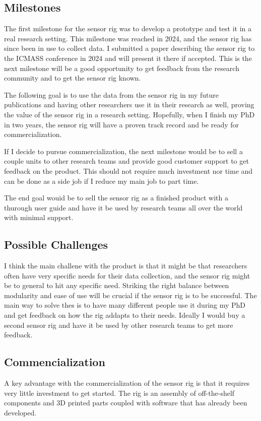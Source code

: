 \documentclass{iopconfser}
\begin{document}
\subsection*{Milestones}
The first milestone for the sensor rig was to develop a prototype and test it in a real research setting.
This milestone was reached in 2024, and the sensor rig has since been in use to collect data.
I submitted a paper describing the sensor rig to the ICMASS conference in 2024 and will present it there if accepted.
This is the next milestone will be a good opportunity to get feedback from the research community and to get the sensor rig known.

The following goal is to use the data from the sensor rig in my future publications and having other researchers use it in their research as well, proving the value of the sensor rig in a research setting.
Hopefully, when I finish my PhD in two years, the sensor rig will have a proven track record and be ready for commercialization.

If I decide to pursue commercialization, the next milestone would be to sell a couple units to other research teams and provide good customer support to get feedback on the product.
This should not require much investment nor time and can be done as a side job if I reduce my main job to part time.

The end goal wouid be to sell the sensor rig as a finished product with a thurough user guide and have it be used by research teams all over the world with minimal support.


\subsection*{Possible Challenges}
I think the main challene with the product is that it might be that researchers often have very specific needs for their data collection, and the sensor rig might be to general to hit any specific need.
Striking the right balance between modularity and ease of use will be crucial if the sensor rig is to be successful.
The main way to solve thes is to have many different people use it during my PhD and get feedback on how the rig addapts to their needs.
Ideally I would buy a second sensor rig and have it be used by other research teams to get more feedback.

\subsection*{Commencialization}
A key advantage with the commercialization of the sensor rig is that it requires very little investment to get started. 
The rig is an assembly of off-the-shelf components and 3D printed parts coupled with software that has already been developed.
\end{document}
